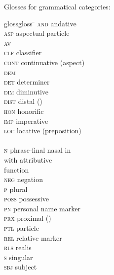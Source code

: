 \documentclass[output=paper
,modfonts
,nonflat]{langsci/langscibook}
\begin{document}
\noindent
Glosses for grammatical categories: 

\begin{multicols}{2}
	\begin{tabbing}
		glossgloss \= \kill
		\textsc{and} \> andative\\
		\textsc{asp} \> aspectual particle\\
		\textsc{av} \> \\
		\textsc{clf} \> classifier\\
		\textsc{cont} \> continuative (aspect)\\
		\textsc{dem} \> \\
		\textsc{det} \> determiner\\
		\textsc{dim} \> diminutive\\
		\textsc{dist} \> distal ()\\
		\textsc{hon} \> honorific\\
		\textsc{imp} \> imperative\\
		\textsc{loc} \> locative (preposition)\\ \\ 
		\textsc{n} \> phrase-final nasal in \\ \>  with attributive \\ \>function\\
		\textsc{neg} \> negation\\
		\textsc{p} \> plural \\
		\textsc{poss} \> possessive\\
		\textsc{pn} \> personal name marker\\
		\textsc{prx} \> proximal ()\\
		\textsc{ptl} \> particle\\
		\textsc{rel} \> relative marker\\
		\textsc{rls} \> realis\\
		\textsc{s} \> singular \\
		\textsc{sbj} \> subject
	\end{tabbing}
\end{multicols}

\printbibliography[heading=subbibliography,notkeyword=this]
\end{document}
